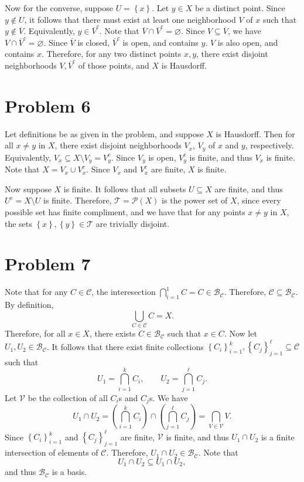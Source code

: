 \documentclass[11pt, letterpaper]{article}
\begin{document}
Now for the converse, suppose $U=\left\{ x \right\} $. Let $y\in X$ be a distinct point. Since $y\notin U$, it follows that there must exist at least one neighborhood $V$ of $x$ such that $y\notin \overline{V} $. Equivalently, $y\in \overline{V} ^{c} $. Note that $\overline{V} \cap \overline{V} ^{c} =\varnothing $. Since $V\subseteq \overline{V} $, we have $V \cap \overline{V} ^{c} =\varnothing $. Since $\overline{V} $ is closed, $\overline{V} ^{c} $ is open, and contains $y$. $V$ is also open, and contains $x$. Therefore, for any two distinct points $x,y$, there exist disjoint neighborhoods $V,\overline{V}^{c}$ of those points, and $X$ is Hausdorff.

\section*{Problem 6}
Let definitions be as given in the problem, and suppose $X$ is Hausdorff. Then for all $x\neq y$ in $X$, there exist disjoint neighborhoods $V_x$, $V_y$ of $x$ and $y$, respectively. Equivalently, $V_x \subseteq X \setminus  V_y = V_y^{c} $. Since $V_y $ is open, $V_y^{c} $ is finite, and thus $V_x$ is finite. Note that $X = V_x \cup V_x^{c} $. Since $V_x$ and $V_x^{c} $ are finite, $X$ is finite.

Now suppose $X$ is finite. It follows that all subsets $U\subseteq X$ are finite, and thus $U^{c} = X \setminus U$ is finite. Therefore, $\mathcal{T} =\mathscr{P} (X)$ is the power set of $X$, since every possible set has finite compliment, and we have that for any points $x\neq y$ in $X$, the sets $\left\{ x \right\} ,\left\{ y \right\} \in \mathcal{T} $ are trivially disjoint.
\section*{Problem 7}
Note that for any $C\in \mathcal{C} $, the interesection $\bigcap_{i=1}^1 C = C\in \mathcal{B}_{\mathcal{C} } $. Therefore, $\mathcal{C} \subseteq \mathcal{B} _{\mathcal{C} } $. By definition,
\[
	\bigcup_{C\in \mathcal{C} } C=X
.\]
Therefore, for all $x\in X$, there exists $C\in \mathcal{B} _{\mathcal{C} } $ such that $x\in C$. Now let $U_1,U_2\in \mathcal{B} _{\mathcal{C} } $. It follows that there exist finite collections $\left\{ C_i \right\}_{i=1}^k, \left\{ C_j \right\}_{j=1}^\ell \subseteq \mathcal{C} $ such that
\[
	U_1 = \bigcap_{i=1} ^k C_i,\qquad U_2=\bigcap_{j=1}^\ell C_j
.\]
Let $\mathcal{V} $ be the collection of all $C_i$s and $C_j$s. We have
\[
	U_1 \cap U_2 = \left( \bigcap_{i=1}^k C_i \right ) \cap \left( \bigcap_{j=1}^\ell C_j \right ) =\bigcap_{V\in \mathcal{V} } V
.\]
Since $\left\{ C_i \right\}_{i=1} ^k$ and $\left\{ C_j \right\}_{j=1} ^\ell $ are finite, $\mathcal{V} $ is finite, and thus $U_1 \cap U_2$ is a finite intersection of elements of $\mathcal{C} $. Therefore, $U_1 \cap U_2\in \mathcal{B} _{\mathcal{C} } $. Note that
\[
	U_1 \cap U_2 \subseteq U_1 \cap U_2
,\]
and thus $\mathcal{B} _{\mathcal{C} } $ is a basis.
\end{document}
